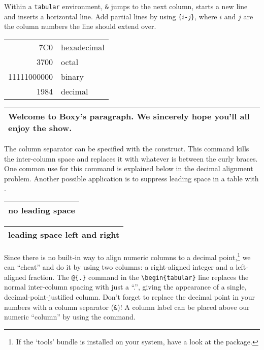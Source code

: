 Within a \texttt{tabular} environment, \texttt{\&} jumps to the next
column, \ci{\bs} starts a new line and  inserts a horizontal
line.  Add partial lines by using \texttt{\{}$i$\texttt{-}$j$\texttt{\}},
where $i$ and $j$ are the column numbers the line should extend over.


\begin{example}
\begin{tabular}{|r|l|}
\hline
7C0 & hexadecimal \\
3700 & octal \\ \cline{2-2}
11111000000 & binary \\
\hline \hline
1984 & decimal \\
\hline
\end{tabular}
\end{example}

\begin{example}
\begin{tabular}{|p{4.7cm}|}
\hline
Welcome to Boxy's paragraph.
We sincerely hope you'll 
all enjoy the show.\\
\hline 
\end{tabular}
\end{example}

The column separator can be specified with the 
construct. This command kills the inter-column space and replaces it
with whatever is between the curly braces.  One common use for
this command is explained below in the decimal alignment problem.
Another possible application is to suppress leading space in a table with
.

\begin{example}
\begin{tabular}{@{} l @{}}
\hline 
no leading space\\
\hline
\end{tabular}
\end{example}

\begin{example}
\begin{tabular}{l}
\hline
leading space left and right\\
\hline
\end{tabular}
\end{example}

%
%

 Since there is no built-in way to align
numeric columns to a decimal point,\footnote{If the `tools' bundle is
  installed on your system, have a look at the  package.}
we can ``cheat'' and do it by using two columns: a right-aligned
integer and a left-aligned fraction. The \verb|@{.}| command in the
\verb|\begin{tabular}| line replaces the normal inter-column spacing with
just a ``.'', giving the appearance of a single,
decimal-point-justified column.  Don't forget to replace the decimal
point in your numbers with a column separator (\verb|&|)! A column label
can be placed above our numeric ``column'' by using the
 command.
 
